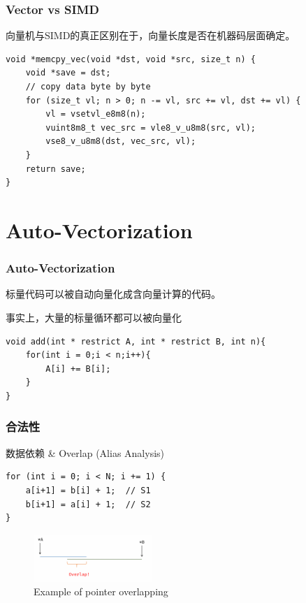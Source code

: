 \documentclass[aspectratio=169]{ctexbeamer}
\begin{document}
\begin{frame}[fragile]
    \frametitle{Vector vs SIMD}

    向量机与SIMD的真正区别在于，向量长度是否在机器码层面确定。

    \begin{lstlisting}
void *memcpy_vec(void *dst, void *src, size_t n) {
    void *save = dst;
    // copy data byte by byte
    for (size_t vl; n > 0; n -= vl, src += vl, dst += vl) {
        vl = vsetvl_e8m8(n);
        vuint8m8_t vec_src = vle8_v_u8m8(src, vl);
        vse8_v_u8m8(dst, vec_src, vl);
    }
    return save;
}
    \end{lstlisting}


\end{frame}

\section{Auto-Vectorization}

\begin{frame}[fragile]
    \frametitle{Auto-Vectorization}

    标量代码可以被自动向量化成含向量计算的代码。

    事实上，大量的标量循环都可以被向量化

    \begin{lstlisting}
void add(int * restrict A, int * restrict B, int n){
    for(int i = 0;i < n;i++){
        A[i] += B[i];
    }
}
    \end{lstlisting}


\end{frame}

\begin{frame}[fragile]
    \frametitle{合法性}

    数据依赖 \& Overlap (Alias Analysis)

    \begin{lstlisting}
for (int i = 0; i < N; i += 1) {
    a[i+1] = b[i] + 1;  // S1
    b[i+1] = a[i] + 1;  // S2
}
    \end{lstlisting}

    \begin{figure}
        \centering
        \includegraphics[width=0.4\textwidth]{images/overlap.png}
        \caption{Example of pointer overlapping}
    \end{figure}

\end{frame}
\end{document}

